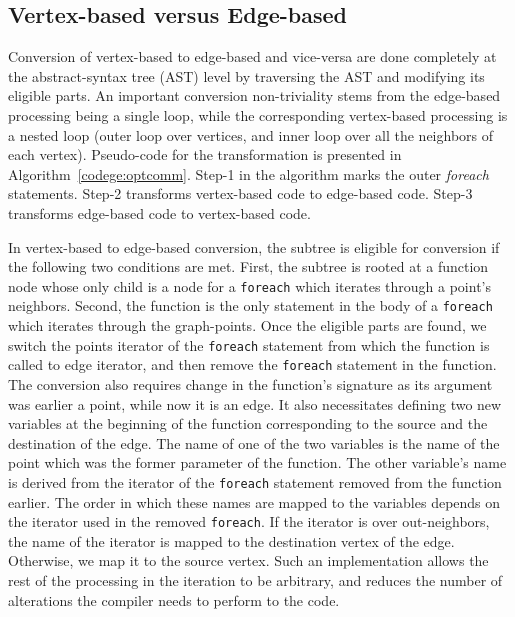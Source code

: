 \subsection{Vertex-based versus Edge-based}\label{sec:vertexedge}
Conversion of vertex-based to edge-based and vice-versa are done completely at the abstract-syntax tree (AST) level  by traversing the AST and modifying its eligible parts. An important conversion non-triviality stems from the edge-based processing being a single loop, while the corresponding vertex-based processing is a nested loop (outer loop over vertices, and inner loop over all the neighbors of each vertex).
Pseudo-code for the transformation is presented in Algorithm~\ref{codege:optcomm}. Step-1 in the algorithm marks the outer \textit{foreach} statements. Step-2 transforms vertex-based code to edge-based code. Step-3 transforms edge-based code to vertex-based code.

In vertex-based to edge-based conversion,  the subtree is eligible for conversion if the following two conditions are met. 
First, the subtree is rooted at a function node whose only child is a node for a \texttt{foreach} which iterates through a point's neighbors. 
Second, the function is the only statement in the body of a \texttt{foreach} which iterates through the graph-points. 
Once the eligible parts are found, we switch the points iterator of the \texttt{foreach} statement from which the function is called to edge iterator, and then remove the \texttt{foreach} statement in the function. 
The conversion also requires change in the function's signature as its argument was earlier a point, while now it is an edge. 
It also necessitates defining two new variables at the beginning of the function corresponding to the source and the destination of the edge. 
The name of one of the two variables is the name of the point which was the former parameter of the function. 
The other variable's name is derived from the iterator of the \texttt{foreach} statement removed from the function earlier. 
The order in which these names are mapped to the variables depends on the iterator used in the removed \texttt{foreach}. 
If the iterator is over out-neighbors, the name of the iterator is mapped to the destination vertex of the edge.
Otherwise, we map it to the source vertex. 
Such an implementation allows the rest of the processing in the iteration to be arbitrary, and reduces the number of alterations the compiler needs to perform to the code.

